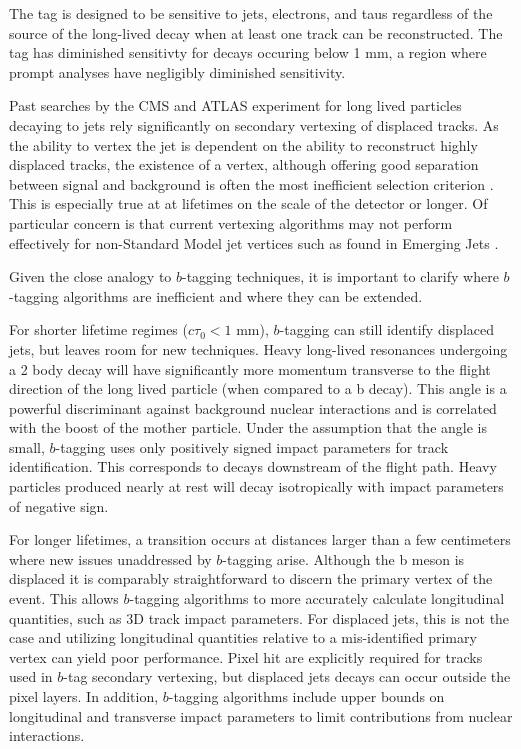 The tag is designed to be sensitive to jets, electrons, and taus regardless of the source of the long-lived decay when at least one track
can be reconstructed. The tag has diminished sensitivty for decays occuring below 1 mm, a region where prompt analyses have negligibly
 diminished sensitivity.

Past searches by the CMS and ATLAS experiment for long lived particles decaying to jets rely significantly 
on secondary vertexing of displaced tracks. As the ability to vertex the jet is dependent on the ability to reconstruct 
highly displaced tracks, the existence of a vertex, although offering good separation between signal and background
 is often the most inefficient selection criterion \cite{CMS:2014wda}. This is especially true at at lifetimes on the scale of the detector or longer. 
Of particular concern is that current vertexing algorithms may not perform effectively
 for non-Standard Model jet vertices such as found in Emerging Jets \cite{emerge}.

Given the close analogy to $b$-tagging techniques, it is important to clarify where $b$-tagging algorithms are inefficient and where they can be extended.

For shorter lifetime regimes ($c\tau_0 < 1$ mm), $b$-tagging  can still identify displaced jets, but leaves room for new techniques. 
Heavy long-lived resonances undergoing a 2 body decay will have significantly more momentum transverse to the flight direction of the long lived particle (when compared to a b decay). This angle is a powerful discriminant against background nuclear interactions and is correlated with the boost of the mother particle. 
Under the assumption that the angle is small, $b$-tagging uses only positively signed impact parameters for track identification. This corresponds to decays downstream of the flight path. Heavy particles produced nearly at rest will decay isotropically with impact parameters of negative sign.

For longer lifetimes, a transition occurs at distances larger than a few centimeters where new issues
 unaddressed by $b$-tagging arise. Although the b meson is displaced
it is comparably straightforward to discern the primary vertex of the event. This allows $b$-tagging
 algorithms to more accurately calculate longitudinal quantities, such as 3D track impact parameters. 
For displaced jets, this is not the case  and utilizing longitudinal quantities 
relative to a mis-identified primary vertex can yield poor performance. 
Pixel hit are explicitly required for tracks used in $b$-tag secondary vertexing,
 but displaced jets decays can occur outside the pixel layers. In addition, $b$-tagging algorithms include upper bounds on
 longitudinal and transverse impact parameters to limit contributions from nuclear interactions.

